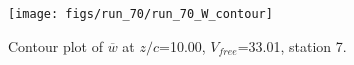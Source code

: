 \begin{figure}[H]
\centering
\texttt{[image: figs/run\_70/run\_70\_W\_contour]}
\caption{Contour plot of $\overline{w}$ at $z/c$=10.00, $V_{free}$=33.01, station 7.}
\label{fig:run_70_W_contour}
\end{figure}


